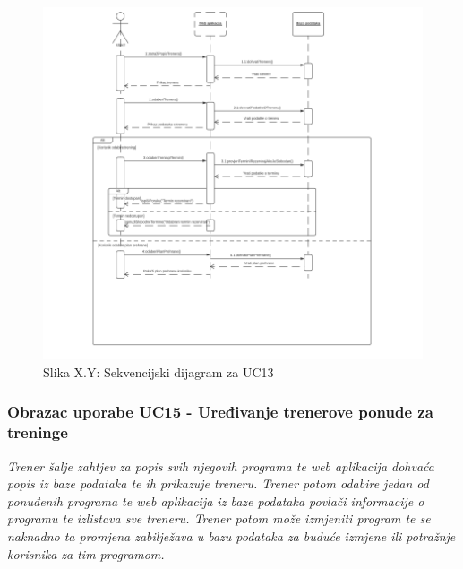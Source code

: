                     \begin{figure}[H]
			            \includegraphics[scale=1.0]{slike/UC13.PNG} %
			            \centering
			            \caption{Slika X.Y: Sekvencijski dijagram za UC13}
			            \label{fig:promjene}
		            \end{figure}
                    
                    
                    \subsubsection{Obrazac uporabe UC15 - Uređivanje trenerove ponude za treninge}
					\textit{Trener šalje zahtjev za popis svih njegovih programa te web aplikacija dohvaća popis
                    iz baze podataka te ih prikazuje treneru. Trener potom odabire jedan od ponuđenih programa
                    te web aplikacija iz baze podataka povlači informacije o programu te izlistava sve treneru.
                    Trener potom može izmjeniti program te se naknadno ta promjena zabilježava u bazu podataka
                    za buduće izmjene ili potražnje korisnika za tim programom.}\\
                    
